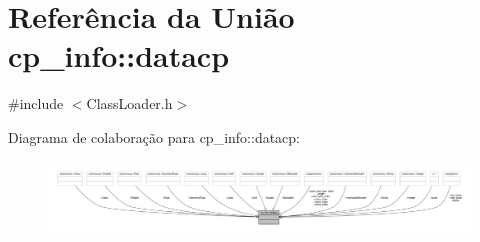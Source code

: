 \hypertarget{unioncp__info_1_1datacp}{}\section{Referência da União cp\+\_\+info\+:\+:datacp}
\label{unioncp__info_1_1datacp}


{\ttfamily \#include $<$Class\+Loader.\+h$>$}



Diagrama de colaboração para cp\+\_\+info\+:\+:datacp\+:\nopagebreak
\begin{figure}[H]
\begin{center}
\leavevmode
\includegraphics[width=350pt]{unioncp__info_1_1datacp__coll__graph}
\end{center}
\end{figure}
